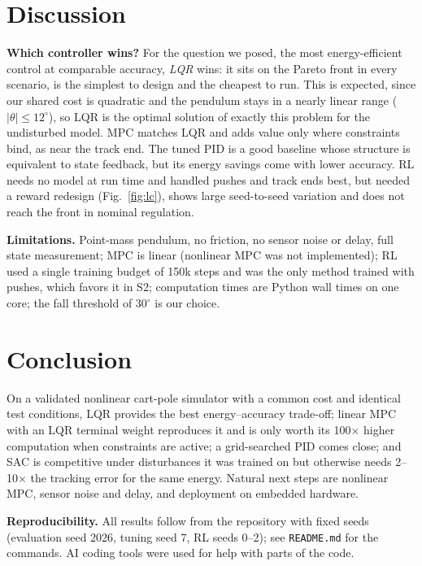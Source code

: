 \documentclass[10pt,twocolumn,a4paper]{article}
\begin{document}
\section{Discussion}
\textbf{Which controller wins?} For the question we posed, the most
energy-efficient control at comparable accuracy, \emph{LQR} wins: it sits on
the Pareto front in every scenario, is the simplest to design and the
cheapest to run. This is expected, since our shared cost is quadratic and the
pendulum stays in a nearly linear range ($|\theta|\le12^\circ$), so LQR is the
optimal solution of exactly this problem for the undisturbed model. MPC
matches LQR and adds value only where constraints bind, as near the track
end. The tuned PID is a good baseline whose structure is equivalent to state
feedback, but its energy savings come with lower accuracy. RL needs no model
at run time and handled pushes and track ends best, but needed a reward
redesign (Fig.~\ref{fig:lc}), shows large seed-to-seed variation and does not reach the front in
nominal regulation.

\textbf{Limitations.} Point-mass pendulum, no friction, no sensor noise or
delay, full state measurement; MPC is linear (nonlinear MPC was not
implemented); RL used a single training budget of 150k steps and was the only
method trained with pushes, which favors it in S2; computation times are
Python wall times on one core; the fall threshold of $30^\circ$ is our
choice.

\section{Conclusion}
On a validated nonlinear cart-pole simulator with a common cost and identical
test conditions, LQR provides the best energy--accuracy trade-off;
linear MPC with an LQR terminal weight reproduces it and is only worth its
100$\times$ higher computation when constraints are active; a grid-searched
PID comes close; and SAC is competitive under disturbances it was trained on
but otherwise needs 2--10$\times$ the tracking error for the same energy.
Natural next steps are nonlinear MPC, sensor noise and delay, and deployment
on embedded hardware.

\textbf{Reproducibility.} All results follow from the repository with fixed
seeds (evaluation seed 2026, tuning seed 7, RL seeds 0--2); see
\texttt{README.md} for the commands. AI coding tools were used for help with parts
of the code.
\end{document}
